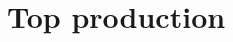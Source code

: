 \documentclass[a4paper, 10pt, openright]{report}
\begin{document}
%
%
%

\section{Top production}
\end{document}
